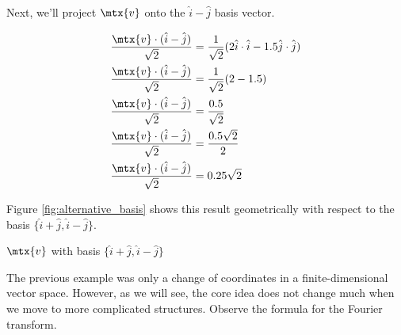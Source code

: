 Next, we'll project $\mtx{v}$ onto the $\hat{i} - \hat{j}$ basis vector.

\begin{align*}
  \frac{\mtx{v} \cdot (\hat{i} - \hat{j})}{\sqrt{2}} &=
    \frac{1}{\sqrt{2}} (2\hat{i} \cdot \hat{i} - 1.5\hat{j} \cdot \hat{j}) \\
  \frac{\mtx{v} \cdot (\hat{i} - \hat{j})}{\sqrt{2}} &=
    \frac{1}{\sqrt{2}} (2 - 1.5) \\
  \frac{\mtx{v} \cdot (\hat{i} - \hat{j})}{\sqrt{2}} &= \frac{0.5}{\sqrt{2}} \\
  \frac{\mtx{v} \cdot (\hat{i} - \hat{j})}{\sqrt{2}} &= \frac{0.5\sqrt{2}}{2} \\
  \frac{\mtx{v} \cdot (\hat{i} - \hat{j})}{\sqrt{2}} &= 0.25\sqrt{2}
\end{align*}

Figure \ref{fig:alternative_basis} shows this result geometrically with respect
to the basis $\{\hat{i} + \hat{j}, \hat{i} - \hat{j}\}$.

\begin{bookfigure}

  \caption{$\mtx{v}$ with basis $\{\hat{i} + \hat{j}, \hat{i} - \hat{j}\}$}
  \label{fig:alternative_basis}
\end{bookfigure}

The previous example was only a change of coordinates in a finite-dimensional
vector space. However, as we will see, the core idea does not change much when
we move to more complicated structures. Observe the formula for the Fourier
transform.

